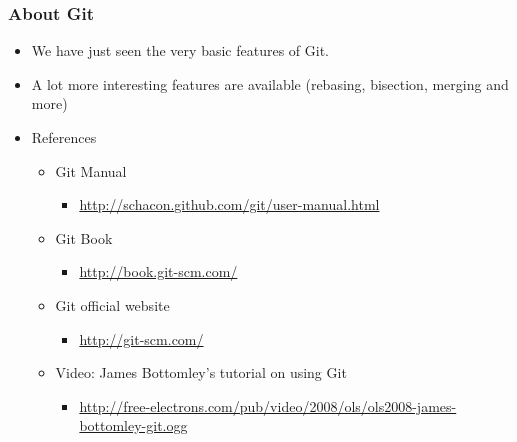 \begin{frame}
  \frametitle{About Git}
  \begin{itemize}
  \item We have just seen the very basic features of Git.
  \item A lot more interesting features are available (rebasing,
    bisection, merging and more)
  \item References
    \begin{itemize}
    \item Git Manual
      \begin{itemize}
      \item \url{http://schacon.github.com/git/user-manual.html}
      \end{itemize}
    \item Git Book
      \begin{itemize}
      \item \url{http://book.git-scm.com/}
      \end{itemize}
    \item Git official website
      \begin{itemize}
      \item \url{http://git-scm.com/}
      \end{itemize}
    \item Video: James Bottomley's tutorial on using Git
      \begin{itemize}
      \item \url{http://free-electrons.com/pub/video/2008/ols/ols2008-james-bottomley-git.ogg}
      \end{itemize}
    \end{itemize}
  \end{itemize}
\end{frame}
